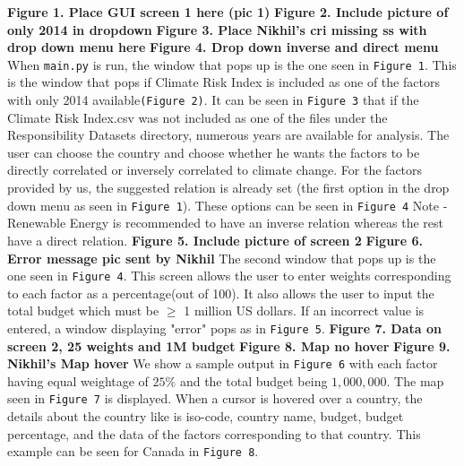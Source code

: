 \documentclass[fontsize=11pt]{article}
\begin{document}
    \textbf{Figure 1. Place GUI  screen 1 here (pic 1)}\newline
    \textbf{Figure 2. Include picture of only 2014 in dropdown}\newline
    \textbf{Figure 3. Place Nikhil's cri missing ss with drop down menu here}\newline
    \textbf{Figure 4. Drop down inverse and direct menu}\newline
    When \texttt{main.py} is run, the window that pops up is the one seen in \texttt{Figure 1}. This is the window that pops if Climate Risk Index
    is included as one of the factors with only 2014 available\texttt{(Figure 2)}. It can be seen in \texttt{Figure 3} that if the Climate Risk Index.csv was not included as one of the files
    under the Responsibility Datasets directory, numerous years are available for analysis.\newline
    The user can choose the country and choose whether he wants the factors to be directly correlated or inversely correlated
    to climate change. For the factors provided by us, the suggested relation is already set (the first option in the drop down
    menu as seen in \texttt{Figure 1}). These options can be seen in \texttt{Figure 4}\newline
    Note - Renewable Energy is recommended to have an inverse relation whereas the rest have a direct relation.\newline
    \textbf{Figure 5. Include picture of screen 2}\newline
    \textbf{Figure 6. Error message pic sent by Nikhil}\newline
    The second window that pops up is the one seen in \texttt{Figure 4}. This screen allows the user to enter weights corresponding to
    each factor as a percentage(out of 100). It also allows the user to input the total budget which must be $\geq$ 1 million US
    dollars. If an incorrect value is entered, a window displaying "error" pops as in \texttt{Figure 5}.\newline
    \textbf{Figure 7. Data on screen 2,  25 weights and 1M budget}\newline
    \textbf{Figure 8. Map no hover}\newline
    \textbf{Figure 9. Nikhil's Map hover}\newline
    We show a sample output in \texttt{Figure 6} with each factor having equal weightage of $25\%$ and the total budget
    being $1,000,000$. The map seen in \texttt{Figure 7} is displayed. When a cursor is hovered over a country, the details about
    the country like is iso-code, country name, budget, budget percentage, and the data of the factors corresponding to that
    country. This example can be seen for Canada in \texttt{Figure 8}.\newline
\end{document}
